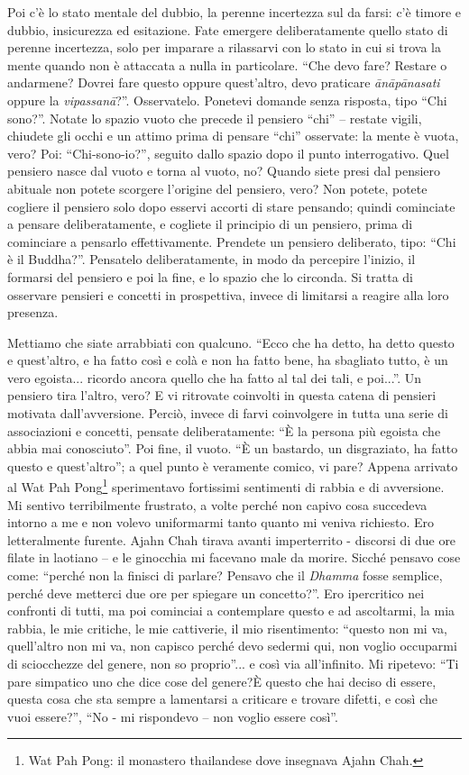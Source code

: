 Poi c'è lo stato mentale del dubbio, la perenne incertezza sul da farsi:
c'è timore e dubbio, insicurezza ed esitazione. Fate emergere
deliberatamente quello stato di perenne incertezza, solo per imparare a
rilassarvi con lo stato in cui si trova la mente quando non è attaccata
a nulla in particolare. ``Che devo fare? Restare o andarmene? Dovrei fare
questo oppure quest'altro, devo praticare \textit{ānāpānasati} oppure la
\textit{vipassanā}?''. Osservatelo. Ponetevi domande senza risposta, tipo ``Chi
sono?''. Notate lo spazio vuoto che precede il pensiero ``chi'' – restate
vigili, chiudete gli occhi e un attimo prima di pensare ``chi'' osservate:
la mente è vuota, vero? Poi: ``Chi-sono-io?'', seguito dallo spazio dopo
il punto interrogativo. Quel pensiero nasce dal vuoto e torna al vuoto,
no? Quando siete presi dal pensiero abituale non potete scorgere
l'origine del pensiero, vero? Non potete, potete cogliere il pensiero
solo dopo esservi accorti di stare pensando; quindi cominciate a pensare
deliberatamente, e cogliete il principio di un pensiero, prima di
cominciare a pensarlo effettivamente. Prendete un pensiero deliberato,
tipo: ``Chi è il Buddha?''. Pensatelo deliberatamente, in modo da
percepire l'inizio, il formarsi del pensiero e poi la fine, e lo spazio
che lo circonda. Si tratta di osservare pensieri e concetti in
prospettiva, invece di limitarsi a reagire alla loro presenza.

Mettiamo che siate arrabbiati con qualcuno. ``Ecco che ha detto, ha detto
questo e quest'altro, e ha fatto così e colà e non ha fatto bene, ha
sbagliato tutto, è un vero egoista... ricordo ancora quello che ha fatto
al tal dei tali, e poi...''. Un pensiero tira l'altro, vero? E vi
ritrovate coinvolti in questa catena di pensieri motivata
dall'avversione. Perciò, invece di farvi coinvolgere in tutta una serie
di associazioni e concetti, pensate deliberatamente: ``È la persona più
egoista che abbia mai conosciuto''. Poi fine, il vuoto. ``È un bastardo,
un disgraziato, ha fatto questo e quest'altro''; a quel punto è veramente
comico, vi pare? Appena arrivato al Wat Pah Pong\footnote{Wat Pah Pong: il monastero thailandese dove insegnava
Ajahn Chah.} sperimentavo
fortissimi sentimenti di rabbia e di avversione. Mi sentivo
terribilmente frustrato, a volte perché non capivo cosa succedeva
intorno a me e non volevo uniformarmi tanto quanto mi veniva richiesto.
Ero letteralmente furente. Ajahn Chah tirava avanti imperterrito -
discorsi di due ore filate in laotiano – e le ginocchia mi facevano male
da morire. Sicché pensavo cose come: ``perché non la finisci di parlare?
Pensavo che il \textit{Dhamma} fosse semplice, perché deve metterci due ore per
spiegare un concetto?''. Ero ipercritico nei confronti di tutti, ma poi
cominciai a contemplare questo e ad ascoltarmi, la mia rabbia, le mie
critiche, le mie cattiverie, il mio risentimento: ``questo non mi va,
quell'altro non mi va, non capisco perché devo sedermi qui, non voglio
occuparmi di sciocchezze del genere, non so proprio''... e così via
all'infinito. Mi ripetevo: ``Ti pare simpatico uno che dice cose del
genere?È questo che hai deciso di essere, questa cosa che sta sempre a
lamentarsi a criticare e trovare difetti, e così che vuoi essere?'', ``No
- mi rispondevo – non voglio essere così''.

